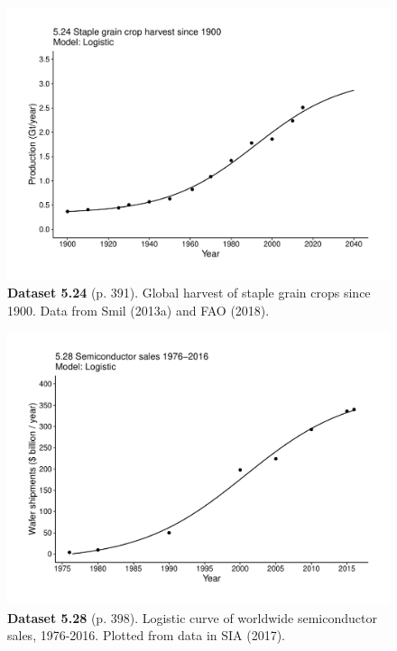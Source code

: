 \documentclass[aps,rmp,preprint,superscriptaddress,10pt,onecolumn]{article}
\begin{document}
\clearpage
\begin{figure}[h]
\includegraphics[width=\textwidth]{output/figs-ggplot/5.24.pdf}
\caption*{\textbf{Dataset 5.24} (p. 391). Global harvest of staple grain crops since 1900. Data from Smil (2013a) and FAO (2018).}
\end{figure}
	
\clearpage
\begin{figure}[h]
\includegraphics[width=\textwidth]{output/figs-ggplot/5.28.pdf}
\caption*{\textbf{Dataset 5.28} (p. 398). Logistic curve of worldwide semiconductor sales, 1976-2016. Plotted from data in SIA (2017).}
\end{figure}
	
\end{document}
